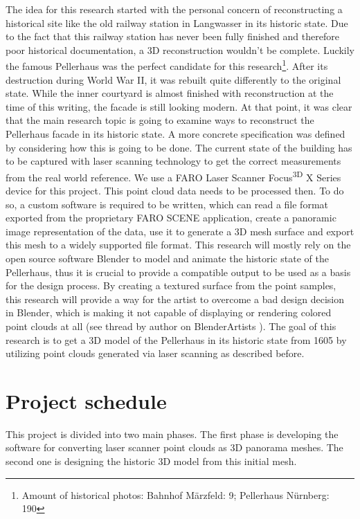The idea for this research started with the personal concern of reconstructing a historical site like the old railway station in Langwasser in its historic state. Due to the fact that this railway station has never been fully finished and therefore poor historical documentation, a 3D reconstruction wouldn't be complete. Luckily the famous Pellerhaus was the perfect candidate for this research\footnote{Amount of historical photos: Bahnhof Märzfeld: 9; Pellerhaus Nürnberg: 190}. After its destruction during World War II, it was rebuilt quite differently to the original state. While the inner courtyard is almost finished with reconstruction at the time of this writing, the facade is still looking modern. At that point, it was clear that the main research topic is going to examine ways to reconstruct the Pellerhaus facade in its historic state.
A more concrete specification was defined by considering how this is going to be done. The current state of the building has to be captured with laser scanning technology to get the correct measurements from the real world reference. We use a FARO Laser Scanner Focus\textsuperscript{3D} X Series device for this project.
This point cloud data needs to be processed then. To do so, a custom software is required to be written, which can read a file format exported from the proprietary FARO SCENE application, create a panoramic image representation of the data, use it to generate a 3D mesh surface and export this mesh to a widely supported file format. This research will mostly rely on the open source software Blender to model and animate the historic state of the Pellerhaus, thus it is crucial to provide a compatible output to be used as a basis for the design process. By creating a textured surface from the point samples, this research will provide a way for the artist to overcome a bad design decision in Blender, which is making it not capable of displaying or rendering colored point clouds at all (see thread by author on BlenderArtists \parencite{webBlenderArtistsPointCloudSupport} ). The goal of this research is to get a 3D model of the Pellerhaus in its historic state from 1605 by utilizing point clouds generated via laser scanning as described before.

\section{Project schedule}

This project is divided into two main phases. The first phase is developing the software for converting laser scanner point clouds as 3D panorama meshes. The second one is designing the historic 3D model from this initial mesh.\\

